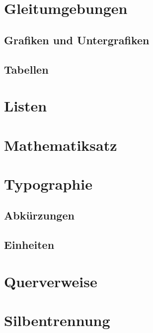 \documentclass[english,ngerman]{tudscrartcl}
\begin{document}
\section{Gleitumgebungen}
\label{sec:floats}

\subsection{Grafiken und Untergrafiken}
\label{sec:graphics}

\subsection{Tabellen}
\label{sec:tables}

\section{Listen}


\section{Mathematiksatz}


\section{Typographie}

\subsection{Abkürzungen}

\subsection{Einheiten}


\section{Querverweise}


\section{Silbentrennung}
\end{document}
